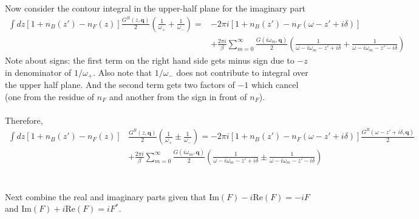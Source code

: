 \documentclass[]{article}
\newcommand{\qq}{\mathbf{q}}
\newcommand{\iwm}{i\omega_m}
\begin{document}
Now consider the contour integral in the upper-half plane for the imaginary part
\begin{equation}
\begin{split}
\int dz \left[1 + n_B(z') - n_F(z)\right] \frac{G^R(z,\qq)}{2}\left(\frac{1}{\omega_+} + \frac{1}{\omega_-} \right) = &-2\pi i\left[1 + n_B(z') - n_F(\omega-z'+i\delta)\right] \\ &+ \frac{2\pi i}{\beta}\sum_{m=0}^{\infty}  \frac{G(\iwm,\qq)}{2}\left(\frac{1}{\omega-\iwm-z'+i\delta} + \frac{1}{\omega-\iwm-z'-i\delta} \right) 
\end{split}
\end{equation}
Note about signs: the first term on the right hand side gets minus sign due to $-z$ in denominator of $1/\omega_+$. Also note that $1/\omega_-$ does not contribute to integral over the upper half plane. And the second term gets two factors of $-1$ which cancel (one from the residue of $n_F$ and another from the sign in front of $n_F$).
\\
\\
Therefore,
\begin{equation}
\begin{split}
\int dz \left[1 + n_B(z') - n_F(z)\right] & \frac{G^R(z,\qq)}{2}\left(\frac{1}{\omega_+} \pm \frac{1}{\omega_-} \right) =
 -2\pi i\left[1 + n_B(z') - n_F(\omega-z'+i\delta)\right] \frac{G^R(\omega-z'+i\delta,\qq)}{2} \\ & + \frac{2\pi i}{\beta}\sum_{m=0}^{\infty}  \frac{G(\iwm,\qq)}{2}\left(\frac{1}{\omega-\iwm-z'+i\delta} \pm \frac{1}{\omega-\iwm-z'-i\delta} \right) 
\end{split}
\end{equation}
\\
\\
Next combine the real and imaginary parts given that $\mathrm{Im}(F)-i\mathrm{Re}(F)=-i F$ and $\mathrm{Im}(F)+i\mathrm{Re}(F)= i F^*$.
\\
\end{document}

